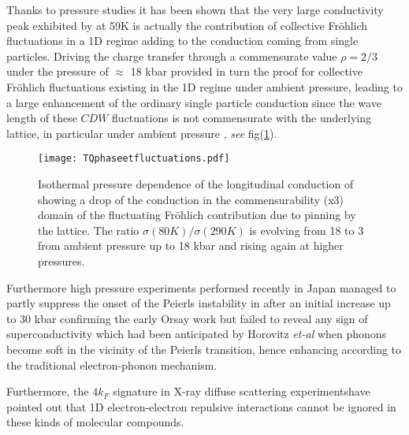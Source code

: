 \documentclass[11pt]{article} %
\begin{document}
Thanks to  pressure studies it has been shown that the very large conductivity peak exhibited by \tq at 59K is actually  the contribution of collective  Fr\"ohlich fluctuations in a 1D regime adding to the conduction coming from  single particles\cite{Friend78}.
Driving the charge transfer through a commensurate value $\rho= 2/3$ under the pressure of $\approx$ 18 kbar provided in turn the proof for collective  Fr\"ohlich fluctuations existing in the 1D regime under ambient pressure, leading  to a large enhancement  of the  ordinary single particle conduction since the wave length of these $CDW$ fluctuations  is not commensurate with the underlying lattice, in particular under ambient pressure
\cite{Friend78}, \textit{see} fig(\ref{TQphaseetfluctuations.pdf}). 
\begin{figure}[h]	 \centerline{\texttt{[image: TQphaseetfluctuations.pdf]}}\caption{Isothermal pressure dependence of the longitudinal conduction of \tq \,  showing a drop of the conduction in the commensurability (x3) domain  of the fluctuating Fr\"ohlich contribution due to pinning by the lattice\cite{Jerome82}.  The ratio $\sigma (80 K)/\sigma (290 K)$ is evolving from 18 to 3 from ambient pressure up to 18 kbar and rising again at higher pressures.   }\label{TQphaseetfluctuations.pdf} \end{figure}
 Furthermore high  pressure experiments performed recently in Japan  managed to   partly suppress the onset  of the  Peierls instability in \ttftcnq\cite{Yasuzuka07} after an initial increase up to 30 kbar confirming the early Orsay work\cite{Friend78} but failed to reveal any sign of superconductivity  which had been anticipated by  Horovitz \textit{et-al}\cite{Horovitz75} when phonons become soft in the vicinity of the Peierls transition, hence enhancing \tc according to the traditional electron-phonon mechanism.


Furthermore, the $4k_F$ signature in X-ray diffuse scattering experiments\cite{Pouget76}have pointed out that  1D electron-electron repulsive interactions cannot be ignored in these kinds of molecular compounds. %
\end{document}

